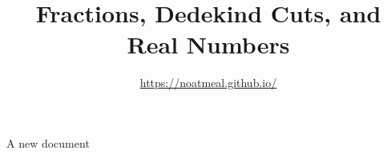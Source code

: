 \documentclass{article}
\title{Fractions, Dedekind Cuts, and Real Numbers}
\author{\url{https://noatmeal.github.io/}}
\date{}
\theoremstyle{definition}
\theoremstyle{definition}
\theoremstyle{plain}
\theoremstyle{remark}
\theoremstyle{plain}
\theoremstyle{remark}
\theoremstyle{plain}
\theoremstyle{plain}
\theoremstyle{plain}
\theoremstyle{plain}
\begin{document}
\maketitle

A new document \cite{recursion_theorem}



\end{document}
